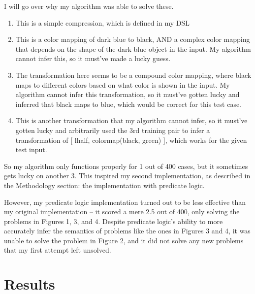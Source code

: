\documentclass[letterpaper]{article} %
\begin{document}
\bigskip

I will go over why my algorithm was able to solve these.
\begin{enumerate}
    \item This is a simple compression, which is defined in my DSL
    \item This is a color mapping of dark blue to black, AND a complex color mapping that depends on the shape of the dark blue object in the input. My algorithm cannot infer this, so it must've made a lucky guess.
    \item The transformation here seems to be a compound color mapping, where black maps to different colors based on what color is shown in the input. My algorithm cannot infer this transformation, so it must've gotten lucky and inferred that black maps to blue, which would be correct for this test case.
    \item This is another transformation that my algorithm cannot infer, so it must've gotten lucky and arbitrarily used the 3rd training pair to infer a transformation of [ lhalf, colormap(black, green) ], which works for the given test input. 
\end{enumerate}

\bigskip

So my algorithm only functions properly for 1 out of 400 cases, but it sometimes gets lucky on another 3. This inspired my second implementation, as described in the Methodology section: the implementation with predicate logic.

\bigskip

However, my predicate logic implementation turned out to be less effective than my original implementation -- it scored a mere 2.5 out of 400,  only solving the problems in Figures 1, 3, and 4. Despite predicate logic's ability to more accurately infer the semantics of problems like the ones in Figures 3 and 4, it was unable to solve the problem in Figure 2, and it did not solve any new problems that my first attempt left unsolved.

\section{Results}

\renewcommand{\arraystretch}{1.5} %
\setlength{\tabcolsep}{10pt}      %

\begin{table}[h!]
    \centering
    \caption{Results Table}
\end{table}
\end{document}
